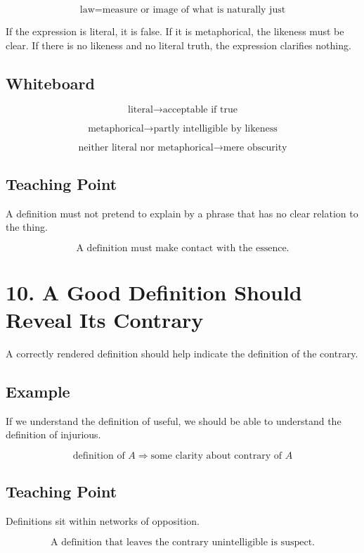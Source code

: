 \documentclass[12pt]{article}
\begin{document}
\[
\text{law} = \text{measure or image of what is naturally just}
\]

If the expression is literal, it is false. If it is metaphorical, the likeness
must be clear. If there is no likeness and no literal truth, the expression
clarifies nothing.

\subsection*{Whiteboard}

\[
\text{literal} \rightarrow \text{acceptable if true}
\]

\[
\text{metaphorical} \rightarrow \text{partly intelligible by likeness}
\]

\[
\text{neither literal nor metaphorical} \rightarrow \text{mere obscurity}
\]

\subsection*{Teaching Point}

A definition must not pretend to explain by a phrase that has no clear relation
to the thing.

\[
\boxed{
\text{A definition must make contact with the essence.}
}
\]

\section*{10. A Good Definition Should Reveal Its Contrary}

A correctly rendered definition should help indicate the definition of the
contrary.

\subsection*{Example}

If we understand the definition of useful, we should be able to understand the
definition of injurious.

\[
\text{definition of } A
\Rightarrow
\text{some clarity about contrary of } A
\]

\subsection*{Teaching Point}

Definitions sit within networks of opposition.

\[
\boxed{
\text{A definition that leaves the contrary unintelligible is suspect.}
}
\]
\end{document}

